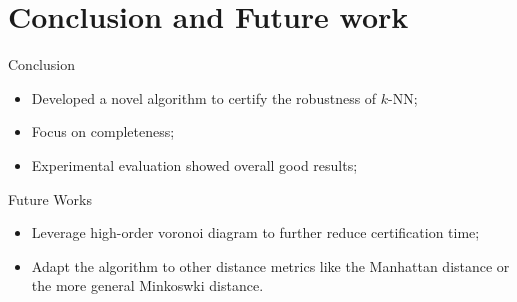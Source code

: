 \section{Conclusion and Future work}

\begin{frame}{Conclusion}
  \begin{itemize}
    \item Developed a novel algorithm to certify the robustness of $k$-NN;
    \item Focus on completeness;
    \item Experimental evaluation showed overall good results;
  \end{itemize}
\end{frame}

\begin{frame}{Future Works}
  \begin{itemize}
    \item Leverage high-order voronoi diagram to further reduce certification time;
    \item Adapt the algorithm to other distance metrics like the Manhattan distance or the more general
          Minkoswki distance.
  \end{itemize}
\end{frame}

